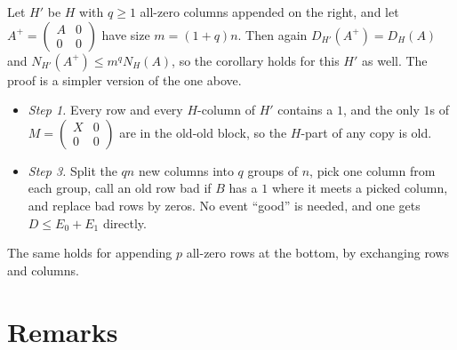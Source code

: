 \documentclass[11pt]{article}
\theoremstyle{plain}
\theoremstyle{definition}
\theoremstyle{remark}
\begin{document}
Let $H'$ be $H$ with $q \ge 1$ all-zero columns appended on the right, and let
$A^+ = \begin{pmatrix} A & 0 \\ 0 & 0 \end{pmatrix}$ have size $m = (1+q)n$. Then again
$D_{H'}(A^+) = D_H(A)$ and $N_{H'}(A^+) \le m^{q} N_H(A)$, so the corollary holds for this
$H'$ as well. The proof is a simpler version of the one above.
\begin{itemize}
\item \emph{Step 1.} Every row and every $H$-column of $H'$ contains a $1$, and the only $1$s
of $M = \begin{pmatrix} X & 0 \\ 0 & 0 \end{pmatrix}$ are in the old-old block, so the $H$-part
of any copy is old.
\item \emph{Step 3.} Split the $qn$ new columns into $q$ groups of $n$, pick one column from
each group, call an old row bad if $B$ has a $1$ where it meets a picked column, and replace
bad rows by zeros. No event ``good'' is needed, and one gets $D \le E_0 + E_1$ directly.
\end{itemize}
The same holds for appending $p$ all-zero rows at the bottom, by exchanging rows and columns.

\section{Remarks}
\end{document}
